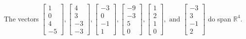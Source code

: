 \begin{exercise}
\begin{exerciseStatement}
  \end{exerciseStatement}
  \begin{exerciseAnswer}
   The vectors \(\left[\begin{array}{r}
1 \\
0 \\
4 \\
-5
\end{array}\right] , \left[\begin{array}{r}
4 \\
3 \\
-3 \\
-3
\end{array}\right] , \left[\begin{array}{r}
-3 \\
0 \\
-1 \\
1
\end{array}\right] , \left[\begin{array}{r}
-9 \\
-3 \\
5 \\
0
\end{array}\right] , \left[\begin{array}{r}
1 \\
2 \\
1 \\
0
\end{array}\right] , \text{ and } \left[\begin{array}{r}
-3 \\
3 \\
-1 \\
2
\end{array}\right]\) 
  	 do  
	span \(\mathbb{R}^4\).
  


  \end{exerciseAnswer}
\end{exercise}
